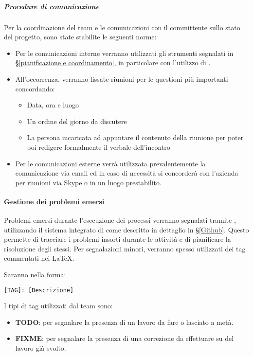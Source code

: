 			\subparagraph{Procedure di comunicazione}
			Per la coordinazione del team e le comunicazioni con il committente sullo stato del progetto, sono state stabilite le seguenti norme:
			\begin{itemize}
				\item Per le comunicazioni interne verranno utilizzati gli strumenti segnalati in \S\ref{pianificazione e coordinamento}, in particolare con l'utilizzo di .
				\item All'occorrenza, verranno fissate riunioni per le questioni più importanti concordando:
					\begin{itemize}
						\item Data, ora e luogo
						\item Un ordine del giorno da discutere
						\item La persona incaricata ad appuntare il contenuto della riunione per poter poi redigere formalmente il verbale dell'incontro
					\end{itemize}
				\item Per le comunicazioni esterne verrà utilizzata prevalentemente la comunicazione via email ed in caso di necessità si concorderà con l'azienda per riunioni via Skype o in un luogo prestabilito. %
			\end{itemize}


    		\paragraph{Gestione dei problemi emersi}
			Problemi emersi durante l'esecuzione dei processi verranno segnalati tramite , utilizzando il sistema integrato di  come descritto in dettaglio in \S\ref{Github}. Questo permette di tracciare i problemi insorti durante le attività e di pianificare la risoluzione degli stessi.
			Per segnalazioni minori, verranno spesso utilizzati dei tag commentati nei  \LaTeX.
			\begin{samepage}
				Saranno nella forma:
				\begin{center}
					\texttt{[TAG]: [Descrizione]}
				\end{center}
			\end{samepage}
			I tipi di tag utilizzati dal team sono:
			\begin{itemize}
				\item \textbf{TODO}: per segnalare la presenza di un lavoro da fare o lasciato a metà.
				\item \textbf{FIXME}: per segnalare la presenza di una correzione da effettuare su del lavoro già svolto.
			\end{itemize}
		
